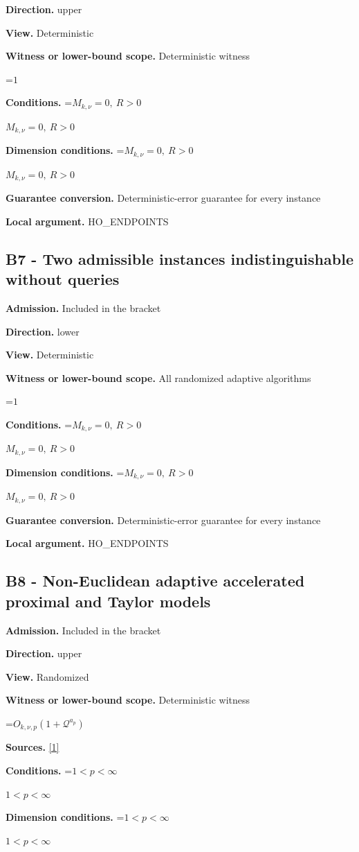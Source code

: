 \documentclass[10pt,a4paper]{article}
\newcommand{\AtlasMath}[1]{\par\begingroup\centering\setbox0=\hbox{$\displaystyle #1$}\ifdim\wd0>1.4\linewidth\typeout{ATLAS WIDE FORMULA: \the\wd0}\fi\ifdim\wd0>\linewidth\resizebox{\linewidth}{!}{\box0}\else\box0\fi\par\endgroup}
\newcommand{\AtlasInlineMath}[1]{\begingroup\setbox0=\hbox{$#1$}\ifdim\wd0>.4\linewidth\endgroup\AtlasMath{#1}\else\endgroup$#1$\fi}
\begin{document}
\textbf{Direction.} upper

\textbf{View.} Deterministic

\textbf{Witness or lower-bound scope.} Deterministic witness

\AtlasMath{1}
\textbf{Conditions.} \AtlasInlineMath{M_{k,\nu}=0,\ R>0}

\textbf{Dimension conditions.} \AtlasInlineMath{M_{k,\nu}=0,\ R>0}

\textbf{Guarantee conversion.} Deterministic-error guarantee for every instance

\textbf{Local argument.} HO\_\allowbreak{}ENDPOINTS

\subsection{B7 - Two admissible instances indistinguishable without queries}
\textbf{Admission.} Included in the bracket

\textbf{Direction.} lower

\textbf{View.} Deterministic

\textbf{Witness or lower-bound scope.} All randomized adaptive algorithms

\AtlasMath{1}
\textbf{Conditions.} \AtlasInlineMath{M_{k,\nu}=0,\ R>0}

\textbf{Dimension conditions.} \AtlasInlineMath{M_{k,\nu}=0,\ R>0}

\textbf{Guarantee conversion.} Deterministic-error guarantee for every instance

\textbf{Local argument.} HO\_\allowbreak{}ENDPOINTS

\subsection{B8 - Non-Euclidean adaptive accelerated proximal and Taylor models}
\textbf{Admission.} Included in the bracket

\textbf{Direction.} upper

\textbf{View.} Randomized

\textbf{Witness or lower-bound scope.} Deterministic witness

\AtlasMath{O_{k,\nu,p}(1+\mathcal{Q}^{a_p})}
\textbf{Sources.} \href{https://arxiv.org/pdf/2411.08987v2}{[1]}

\textbf{Conditions.} \AtlasInlineMath{1<p<\infty}

\textbf{Dimension conditions.} \AtlasInlineMath{1<p<\infty}
\end{document}
